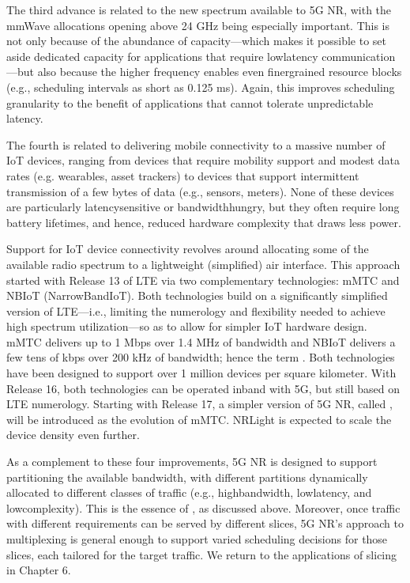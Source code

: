 \documentclass[a4paper,11pt,english]{sphinxmanual}
\begin{document}
\sphinxAtStartPar
The third advance is related to the new spectrum available to 5G NR,
with the mmWave allocations opening above 24 GHz being especially
important. This is not only because of the abundance of capacity—which
makes it possible to set aside dedicated capacity for
applications that require low\sphinxhyphen{}latency communication—but also because
the higher frequency enables even finer\sphinxhyphen{}grained resource blocks (e.g.,
scheduling intervals as short as 0.125 ms). Again, this improves
scheduling granularity to the benefit of applications that cannot
tolerate unpredictable latency.

\sphinxAtStartPar
The fourth is related to delivering mobile connectivity to a massive
number of IoT devices, ranging from devices that require mobility
support and modest data rates (e.g. wearables, asset trackers) to
devices that support intermittent transmission of a few bytes of data
(e.g., sensors, meters). None of these devices are particularly
latency\sphinxhyphen{}sensitive or bandwidth\sphinxhyphen{}hungry, but they often require long
battery lifetimes, and hence, reduced hardware complexity that draws
less power.

\sphinxAtStartPar
Support for IoT device connectivity revolves around allocating some of
the available radio spectrum to a light\sphinxhyphen{}weight (simplified) air
interface. This approach started with Release 13 of LTE via two
complementary technologies: mMTC and NB\sphinxhyphen{}IoT (NarrowBand\sphinxhyphen{}IoT). Both
technologies build on a significantly simplified version of LTE—i.e.,
limiting the numerology and flexibility needed to achieve high spectrum
utilization—so as to allow for simpler IoT hardware design. mMTC
delivers up to 1 Mbps over 1.4 MHz of bandwidth and NB\sphinxhyphen{}IoT delivers a
few tens of kbps over 200 kHz of bandwidth; hence the term
. Both technologies have been designed to support over
1 million devices per square kilometer. With Release 16, both
technologies can be operated in\sphinxhyphen{}band with 5G, but still based on LTE
numerology. Starting with Release 17, a simpler version of 5G NR,
called , will be introduced as the evolution of mMTC.
NR\sphinxhyphen{}Light is expected to scale the device density even further.

\sphinxAtStartPar
As a complement to these four improvements, 5G NR is designed to
support partitioning the available bandwidth, with different
partitions dynamically allocated to different classes of traffic
(e.g., high\sphinxhyphen{}bandwidth, low\sphinxhyphen{}latency, and low\sphinxhyphen{}complexity). This is
the essence of , as discussed above.
Moreover, once traffic with different requirements can be served by
different slices, 5G NR’s approach to multiplexing is general enough
to support varied scheduling decisions for those slices, each tailored
for the target traffic. We return to the applications of slicing in
Chapter 6.
\end{document}

